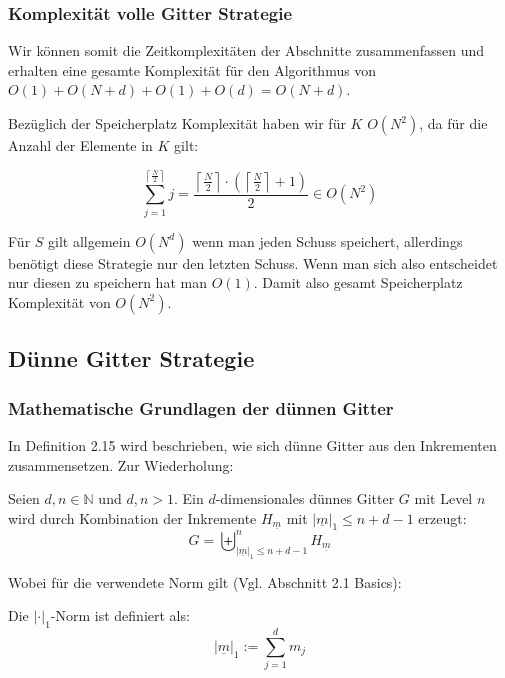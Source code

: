 \documentclass[a4paper,12pt]{llncs}
\numberwithin{equation}{section}
\begin{document}
\subsubsection{Komplexität volle Gitter Strategie}

Wir können somit die Zeitkomplexitäten der Abschnitte zusammenfassen und erhalten eine gesamte Komplexität für den Algorithmus von $O(1)+O(N+d)+O(1)+O(d)=O(N+d)$.


Bezüglich der Speicherplatz Komplexität haben wir für $K$ $O(N^2)$, da für die Anzahl der Elemente in $K$ gilt:

\begin{equation}
\sum_{j=1}^{\left\lceil\frac{N}{2}\right\rceil}j=\frac{\left\lceil\frac{N}{2}\right\rceil\cdot\left(\left\lceil\frac{N}{2}\right\rceil+1\right)}{2}\in O\left(N^2\right)
\end{equation}


Für $S$ gilt allgemein $O(N^d)$ wenn man jeden Schuss speichert, allerdings benötigt diese Strategie nur den letzten Schuss. Wenn man sich also entscheidet nur diesen zu speichern hat man $O(1)$. Damit also gesamt Speicherplatz Komplexität von $O(N^2)$.


\subsection{Dünne Gitter Strategie}

\subsubsection{Mathematische Grundlagen der dünnen Gitter}

In \cite{M13} Definition 2.15 wird beschrieben, wie sich dünne Gitter aus den Inkrementen zusammensetzen. Zur Wiederholung:

\begin{definition}
	Seien $d,n\in\mathbb{N}$ und $d,n>1$. Ein $d$-dimensionales dünnes Gitter $G$ mit Level $n$ wird durch Kombination der Inkremente $H_{\underline{m}}$ mit $|\underline{m}|_1\leq n+d-1$ erzeugt:
	\begin{equation}
	G=\biguplus_{|\underline{m}|_1\leq n+d-1}^n H_{\underline{m}}
	\end{equation}
\end{definition}

Wobei für die verwendete Norm gilt (Vgl. \cite{P10} Abschnitt 2.1 Basics):

\begin{definition}
Die  $|\cdot|_1$-Norm ist definiert als:
	\begin{equation}
	|\underline{m}|_1:=\sum_{j=1}^d m_j
	\end{equation}
\end{definition}
\end{document}
